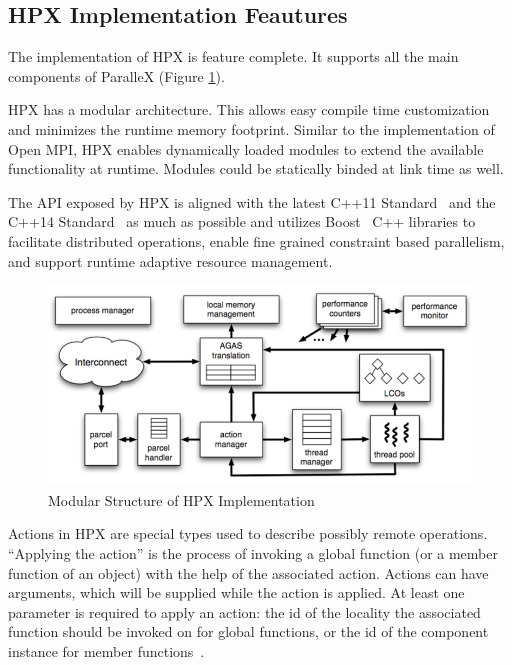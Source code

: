 \subsection{HPX Implementation Feautures}

The implementation of HPX is feature complete. It supports all the main components of ParalleX (Figure \ref{fig:hpx-structure}).

HPX has a modular architecture. This allows easy compile time customization and minimizes the runtime memory footprint. Similar to the implementation of Open MPI, HPX enables dynamically loaded modules to extend the available functionality at runtime. Modules could be statically binded at link time as well.

The API exposed by HPX is aligned with the latest C++11 Standard~\cite{c++11} and the C++14 Standard~\cite{c++14} as much as possible and utilizes Boost~\cite{dawes2009boost} C++ libraries to facilitate distributed operations, enable fine grained constraint based parallelism, and support runtime adaptive resource management\cite{kaiser2014hpx}.

\begin{figure}[h!]
\centering
\includegraphics[scale=0.5]{images/hpx.png}
\caption[Modular Structure of HPX Implementation]{Modular Structure of HPX Implementation~\cite{anderson2011application}}
\label{fig:hpx-structure}
\end{figure}

Actions in HPX are special types used to describe possibly remote operations. ``Applying the action'' is the process of invoking a global function (or a member function of an object) with the help of the associated action. Actions can have arguments, which will be supplied while the action is applied. At least one parameter is required to apply an action: the id of the locality the associated function should be invoked on for global functions, or the id of the component instance for member functions~\cite{ghimire2014data}.


